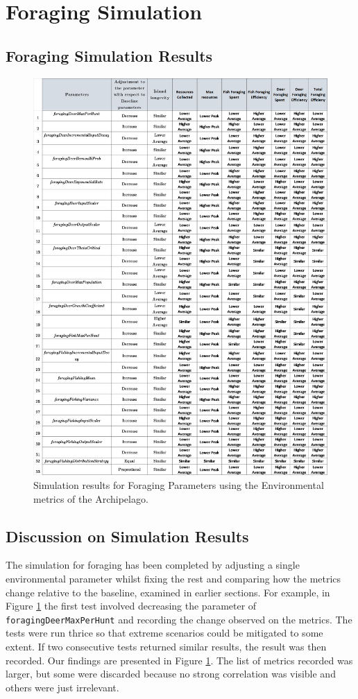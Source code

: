 \section{Foraging Simulation}
\subsection{Foraging Simulation Results}
\begin{figure}[!htb]
    \centering
    \includegraphics[width=1\textwidth]{16_results_and_eval/images/ForageCommonSim.png}
    \caption{Simulation results for Foraging Parameters using the Environmental metrics of the Archipelago.}
    \label{fig:Resource}
\end{figure}
\subsection{Discussion on Simulation Results}
The simulation for foraging has been completed by adjusting a single environmental parameter whilst fixing the rest and comparing how the metrics change relative to the baseline, examined in earlier sections. For example, in Figure \ref{fig:Resource} the first test involved decreasing the parameter of \texttt{foragingDeerMaxPerHunt} and recording the change observed on the metrics. The tests were run thrice so that extreme scenarios could be mitigated to some extent. If two consecutive tests returned similar results, the result was then recorded. Our findings are presented in Figure \ref{fig:Resource}. The list of metrics recorded was larger, but some were discarded because no strong correlation was visible and others were just irrelevant. 

